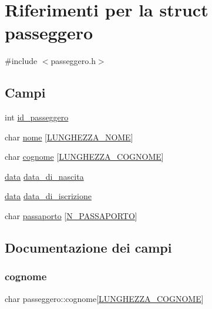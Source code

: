 \hypertarget{structpasseggero}{}\section{Riferimenti per la struct passeggero}
\label{structpasseggero}


{\ttfamily \#include $<$passeggero.\+h$>$}

\subsection*{Campi}
\begin{DoxyCompactItemize}
\item 
int \hyperlink{structpasseggero_a7c93d49321aca33cb2a17618006ac331}{id\+\_\+passeggero}
\item 
char \hyperlink{structpasseggero_a6ab3d88e71633a8e7bef32160dacd50d}{nome} \mbox{[}\hyperlink{costanti_8h_a1174c9cabf872f9154fcec903a6e0395}{L\+U\+N\+G\+H\+E\+Z\+Z\+A\+\_\+\+N\+O\+ME}\mbox{]}
\item 
char \hyperlink{structpasseggero_a135ebc820881eb9c1f21de662eed9893}{cognome} \mbox{[}\hyperlink{costanti_8h_a32b09f13e00fe1f3a14c37c08588c830}{L\+U\+N\+G\+H\+E\+Z\+Z\+A\+\_\+\+C\+O\+G\+N\+O\+ME}\mbox{]}
\item 
\hyperlink{structdata}{data} \hyperlink{structpasseggero_ada3bb755b2475dcfc18a9fdc1a277038}{data\+\_\+di\+\_\+nascita}
\item 
\hyperlink{structdata}{data} \hyperlink{structpasseggero_a197bb077177f03bd7bd0368e5b9c8647}{data\+\_\+di\+\_\+iscrizione}
\item 
char \hyperlink{structpasseggero_a528684369528c7278332209e8b022d69}{passaporto} \mbox{[}\hyperlink{costanti_8h_aadeea3748411f923275f2744dbb26cd1}{N\+\_\+\+P\+A\+S\+S\+A\+P\+O\+R\+TO}\mbox{]}
\end{DoxyCompactItemize}


\subsection{Documentazione dei campi}
\mbox{\label{structpasseggero_a135ebc820881eb9c1f21de662eed9893}} 
\subsubsection{\texorpdfstring{cognome}{cognome}}
{\footnotesize\ttfamily char passeggero\+::cognome\mbox{[}\hyperlink{costanti_8h_a32b09f13e00fe1f3a14c37c08588c830}{L\+U\+N\+G\+H\+E\+Z\+Z\+A\+\_\+\+C\+O\+G\+N\+O\+ME}\mbox{]}}

